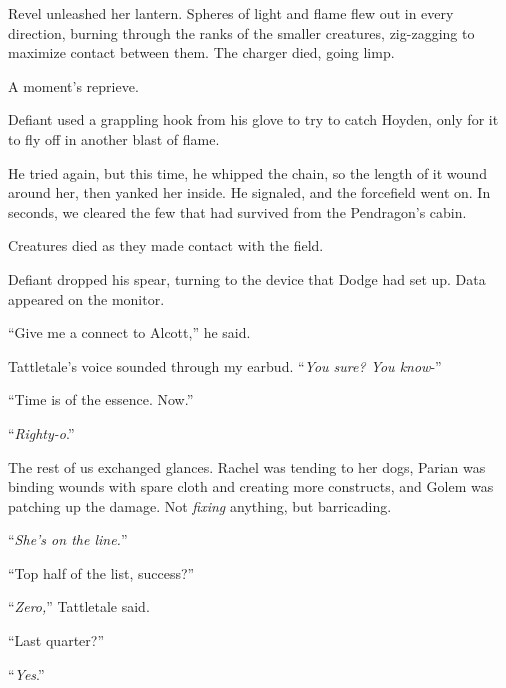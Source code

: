 Revel unleashed her lantern.  Spheres of light and flame flew out in every direction, burning through the ranks of the smaller creatures, zig-zagging to maximize contact between them.  The charger died, going limp.



A moment's reprieve.



Defiant used a grappling hook from his glove to try to catch Hoyden, only for it to fly off in another blast of flame.



He tried again, but this time, he whipped the chain, so the length of it wound around her, then yanked her inside.  He signaled, and the forcefield went on.  In seconds, we cleared the few that had survived from the Pendragon's cabin.



Creatures died as they made contact with the field.



Defiant dropped his spear, turning to the device that Dodge had set up.  Data appeared on the monitor.



``Give me a connect to Alcott,'' he said.



Tattletale's voice sounded through my earbud.  ``\emph{You sure?  You know}-''



``Time is of the essence.  Now.''



``\emph{Righty-o}.''



The rest of us exchanged glances.  Rachel was tending to her dogs, Parian was binding wounds with spare cloth and creating more constructs, and Golem was patching up the damage.  Not \emph{fixing} anything, but barricading.



``\emph{She's on the line.}''



``Top half of the list, success?''



``\emph{Zero,}'' Tattletale said.



``Last quarter?''



``\emph{Yes}.''



